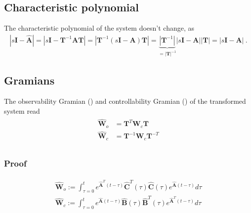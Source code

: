 \documentclass[letterpaper,10pt,english]{jupyterBook}
\begin{document}
\subsection{Characteristic polynomial}
\label{\detokenize{ch/system-theory/coordinate-transformation:characteristic-polynomial}}
\sphinxAtStartPar
The characteristic polynomial of the system doesn’t change, as
\begin{equation*}
\begin{split}\left| s \mathbf{I} - \hat{\mathbf{A}} \right| = \left| s \mathbf{I} - \mathbf{T}^{-1} \mathbf{A} \mathbf{T} \right| = \left| \mathbf{T}^{-1} \left( s \mathbf{I} - \mathbf{A} \right) \mathbf{T} \right| = \underbrace{\left| \mathbf{T}^{-1} \right|}_{= \left| \mathbf{T} \right|^{-1}} \left| s \mathbf{I} - \mathbf{A} \right| \left| \mathbf{T} \right| = \left| s \mathbf{I} - \mathbf{A} \right| \ .\end{split}
\end{equation*}

\subsection{Gramians}
\label{\detokenize{ch/system-theory/coordinate-transformation:gramians}}
\sphinxAtStartPar
The observability Gramian ({\hyperref[\detokenize{ch/system-theory/observability-detectability:def:observability-gramian}]{}}) and controllability Gramian ({\hyperref[\detokenize{ch/system-theory/controllability-reachability:def:controllability-gramian}]{}}) of the transformed system read
\begin{equation*}
\begin{split}\begin{aligned}
\hat{\mathbf{W}}_o & = \mathbf{T}^{ T} \mathbf{W}_c \mathbf{T}      \\
\hat{\mathbf{W}}_c & = \mathbf{T}^{-1} \mathbf{W}_c \mathbf{T}^{-T} \\
\end{aligned}\end{split}
\end{equation*}\subsubsection*{Proof}
\begin{equation*}
\begin{split}\begin{aligned}
  \hat{\mathbf{W}}_o := \int_{\tau = 0}^{t} e^{\hat{\mathbf{A}}^T (t-\tau)} \hat{\mathbf{C}}^T(\tau) \hat{\mathbf{C}}(\tau) e^{\hat{\mathbf{A}}(t-\tau)} d \tau \\
  \hat{\mathbf{W}}_c := \int_{\tau = 0}^{t} e^{\hat{\mathbf{A}} (t-\tau)} \hat{\mathbf{B}}(\tau) \hat{\mathbf{B}}^T(\tau) e^{\hat{\mathbf{A}}^T(t-\tau)} d \tau \\
\end{aligned}\end{split}
\end{equation*}
\end{document}
